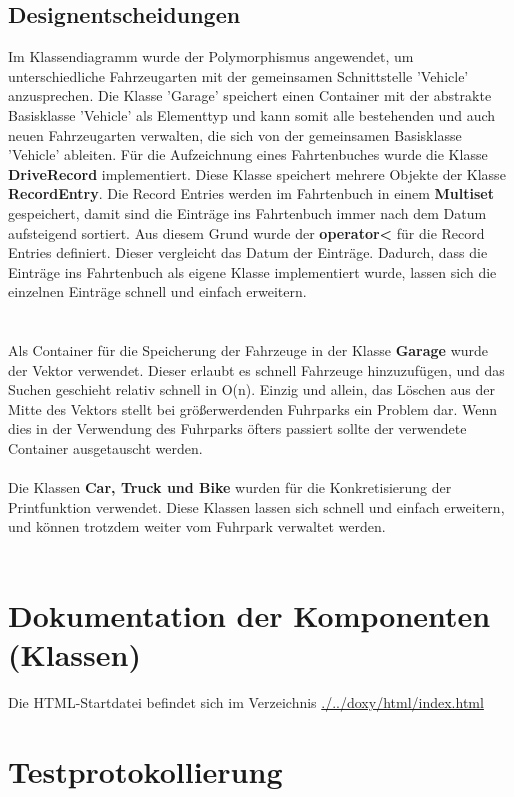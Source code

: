 \documentclass[12pt,naustrian,a4widepaper]{scrartcl}
\begin{document}
\subsection{Designentscheidungen}
Im Klassendiagramm wurde der Polymorphismus angewendet, um unterschiedliche Fahrzeugarten mit der gemeinsamen Schnittstelle 'Vehicle' anzusprechen. Die Klasse 'Garage' speichert einen Container mit der abstrakte Basisklasse 'Vehicle' als Elementtyp und kann somit alle bestehenden und auch neuen Fahrzeugarten verwalten, die sich von der gemeinsamen Basisklasse 'Vehicle' ableiten.
Für die Aufzeichnung eines Fahrtenbuches wurde die Klasse \textbf{DriveRecord} implementiert. Diese Klasse speichert mehrere Objekte der Klasse \textbf{RecordEntry}.
Die Record Entries werden im Fahrtenbuch in einem \textbf{Multiset} gespeichert, damit sind die Einträge ins Fahrtenbuch immer nach dem Datum aufsteigend sortiert.
Aus diesem Grund wurde der \textbf{operator<} für die Record Entries definiert. Dieser vergleicht das Datum der Einträge.
Dadurch, dass die Einträge ins Fahrtenbuch als eigene Klasse implementiert wurde, lassen sich die einzelnen Einträge schnell und einfach erweitern.\\
\\
\\
Als Container für die Speicherung der Fahrzeuge in der Klasse \textbf{Garage} wurde der Vektor verwendet. 
Dieser erlaubt es schnell Fahrzeuge hinzuzufügen, und das Suchen geschieht relativ schnell in O(n).
Einzig und allein, das Löschen aus der Mitte des Vektors stellt bei größerwerdenden Fuhrparks ein Problem dar.
Wenn dies in der Verwendung des Fuhrparks öfters passiert sollte der verwendete Container ausgetauscht werden.
\\
\\
Die Klassen \textbf{Car, Truck und Bike} wurden für die Konkretisierung der Printfunktion verwendet.
Diese Klassen lassen sich schnell und einfach erweitern, und können trotzdem weiter vom Fuhrpark verwaltet werden.\\
\\

\color{black}

\section{Dokumentation der Komponenten (Klassen)}
Die HTML-Startdatei befindet sich im Verzeichnis \href{run:./../doxy/html/index.html}{./../doxy/html/index.html}

\clearpage
\section{Testprotokollierung}

\end{document}
